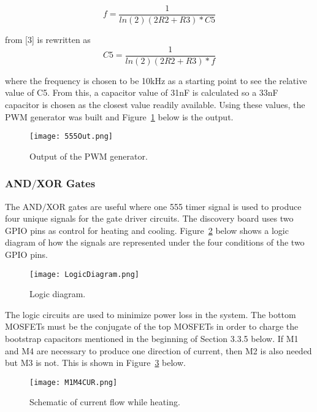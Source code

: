 \documentclass[11pt,letter]{article}
\begin{document}
\begin{equation}
    f = \frac{1}{ln(2)(2R2+R3)*C5}
\end{equation}

from [3] is rewritten as 
\begin{equation}
    C5 = \frac{1}{ln(2)(2R2+R3)*f}
\end{equation}

where the frequency is chosen to be 10kHz as a starting point to see the relative value of C5. From this, a capacitor value of 31nF is calculated so a 33nF capacitor is chosen as the closest value readily available. Using these values, the PWM generator was built and Figure~\ref{fig:555} below is the output.

\begin{figure}[H]
    \centering
    \texttt{[image: 555Out.png]}
    \caption{Output of the PWM generator.}
    \label{fig:555}
\end{figure}

\subsubsection{AND$/$XOR Gates} %

The AND$/$XOR gates are useful where one 555 timer signal is used to produce four unique signals for the gate driver circuits. The discovery board uses two GPIO pins as control for heating and cooling. Figure~\ref{fig:LogicDiagram} below shows a logic diagram of how the signals are represented under the four conditions of the two GPIO pins.

\begin{figure}[H]
    \centering
    \texttt{[image: LogicDiagram.png]}
    \caption{Logic diagram.}
    \label{fig:LogicDiagram}
\end{figure}

The logic circuits are used to minimize power loss in the system. The bottom MOSFETs must be the conjugate of the top MOSFETs in order to charge the bootstrap capacitors mentioned in the beginning of Section 3.3.5 below. If M1 and M4 are necessary to produce one direction of current, then M2 is also needed but M3 is not. This is shown in Figure~\ref{fig:HEATCUR} below. 

\begin{figure}[H]
    \centering
    \texttt{[image: M1M4CUR.png]}
    \caption{Schematic of current flow while heating.}
    \label{fig:HEATCUR}
\end{figure}
\end{document}
